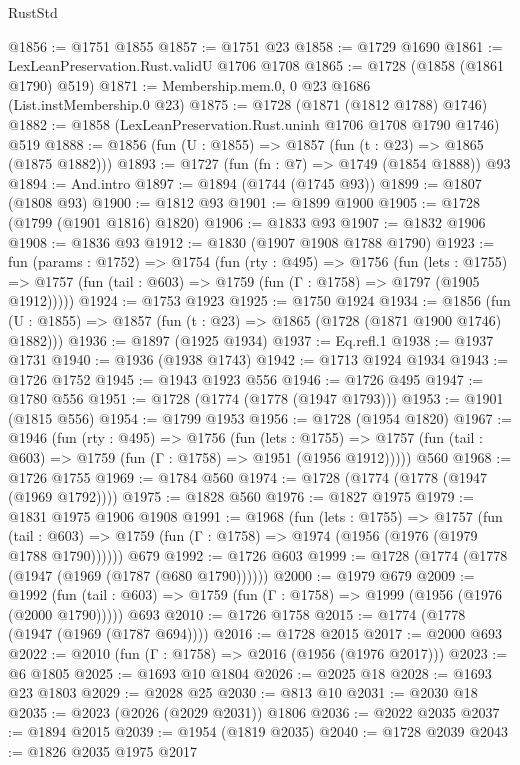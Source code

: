 \begin{lexlean}{RustStd}
\begin{coremodule}
{\begin{coremodule}
{{{{{{{{{{{{{@1856 := @1751 @1855
@1857 := @1751 @23
@1858 := @1729 @1690
@1861 := LexLeanPreservation.Rust.validU @1706 @1708
@1865 := @1728 (@1858 (@1861 @1790) @519)
@1871 := Membership.mem.{0, 0} @23 @1686 (List.instMembership.{0} @23)
@1875 := @1728 (@1871 (@1812 @1788) @1746)
@1882 := @1858 (LexLeanPreservation.Rust.uninh @1706 @1708 @1790 @1746) @519
@1888 := @1856 (fun (U : @1855) => @1857 (fun (t : @23) => @1865 (@1875 @1882)))
@1893 := @1727 (fun (fn : @7) => @1749 (@1854 @1888)) @93
@1894 := And.intro
@1897 := @1894 (@1744 (@1745 @93))
@1899 := @1807 (@1808 @93)
@1900 := @1812 @93
@1901 := @1899 @1900
@1905 := @1728 (@1799 (@1901 @1816) @1820)
@1906 := @1833 @93
@1907 := @1832 @1906
@1908 := @1836 @93
@1912 := @1830 (@1907 @1908 @1788 @1790)
@1923 := fun (params : @1752) =>
  @1754
    (fun (rty : @495) =>
    @1756
      (fun (lets : @1755) =>
      @1757 (fun (tail : @603) => @1759 (fun (Γ : @1758) => @1797 (@1905 @1912)))))
@1924 := @1753 @1923
@1925 := @1750 @1924
@1934 := @1856 (fun (U : @1855) => @1857 (fun (t : @23) => @1865 (@1728 (@1871 @1900 @1746) @1882)))
@1936 := @1897 (@1925 @1934)
@1937 := Eq.refl.{1}
@1938 := @1937 @1731
@1940 := @1936 (@1938 @1743)
@1942 := @1713 @1924 @1934
@1943 := @1726 @1752
@1945 := @1943 @1923 @556
@1946 := @1726 @495
@1947 := @1780 @556
@1951 := @1728 (@1774 (@1778 (@1947 @1793)))
@1953 := @1901 (@1815 @556)
@1954 := @1799 @1953
@1956 := @1728 (@1954 @1820)
@1967 := @1946
    (fun (rty : @495) =>
    @1756
      (fun (lets : @1755) =>
      @1757 (fun (tail : @603) => @1759 (fun (Γ : @1758) => @1951 (@1956 @1912)))))
    @560
@1968 := @1726 @1755
@1969 := @1784 @560
@1974 := @1728 (@1774 (@1778 (@1947 (@1969 @1792))))
@1975 := @1828 @560
@1976 := @1827 @1975
@1979 := @1831 @1975 @1906 @1908
@1991 := @1968
    (fun (lets : @1755) =>
    @1757
      (fun (tail : @603) => @1759 (fun (Γ : @1758) => @1974 (@1956 (@1976 (@1979 @1788 @1790))))))
    @679
@1992 := @1726 @603
@1999 := @1728 (@1774 (@1778 (@1947 (@1969 (@1787 (@680 @1790))))))
@2000 := @1979 @679
@2009 := @1992
    (fun (tail : @603) => @1759 (fun (Γ : @1758) => @1999 (@1956 (@1976 (@2000 @1790)))))
    @693
@2010 := @1726 @1758
@2015 := @1774 (@1778 (@1947 (@1969 (@1787 @694))))
@2016 := @1728 @2015
@2017 := @2000 @693
@2022 := @2010 (fun (Γ : @1758) => @2016 (@1956 (@1976 @2017)))
@2023 := @6 @1805
@2025 := @1693 @10 @1804
@2026 := @2025 @18
@2028 := @1693 @23 @1803
@2029 := @2028 @25
@2030 := @813 @10
@2031 := @2030 @18
@2035 := @2023 (@2026 (@2029 @2031)) @1806
@2036 := @2022 @2035
@2037 := @1894 @2015
@2039 := @1954 (@1819 @2035)
@2040 := @1728 @2039
@2043 := @1826 @2035 @1975 @2017
}}}}}}}}}}}}}
\end{coremodule}}
\end{coremodule}
\end{lexlean}
